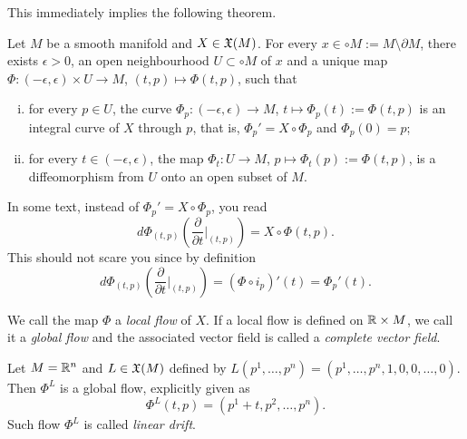 This immediately implies the following theorem.

\begin{theorem} %
  \label{thm:exuniqloc}
  Let $M$ be a smooth manifold and $X\in\mathfrak{X}(M)$. For every $x\in \circ M := M\setminus \partial M$, there exists $\epsilon > 0$, an open neighbourhood $U\subset\circ M$ of $x$ and a unique map $\Phi : (-\epsilon, \epsilon) \times U \to M$, $(t, p) \mapsto \Phi(t,p)$, such that
  \begin{enumerate}[(i)]
    \item for every $p\in U$, the curve $\Phi_p : (-\epsilon, \epsilon) \to M$, $t\mapsto \Phi_p(t) := \Phi(t, p)$ is an integral curve of $X$ through $p$, that is, $\Phi_p' = X\circ\Phi_p$ and $\Phi_p(0) = p$;
    \item for every $t\in(-\epsilon, \epsilon)$, the map $\Phi_t: U \to M$, $p\mapsto \Phi_t(p):=\Phi(t,p)$, is a diffeomorphism from $U$ onto an open subset of $M$.
  \end{enumerate}
\end{theorem}
  
\begin{remark}
  In some text, instead of $\Phi_p' = X\circ\Phi_p$, you read
  \begin{equation}
    d\Phi_{(t,p)}\left(\frac{\partial}{\partial t}\Big|_{(t,p)}\right) = X \circ \Phi(t,p).
  \end{equation}
  This should not scare you since by definition
  \begin{equation}
    d\Phi_{(t,p)}\left(\frac{\partial}{\partial t}\Big|_{(t,p)}\right) = (\Phi \circ i_p)'(t) = \Phi_p'(t).
  \end{equation}
\end{remark}

We call the map $\Phi$ a \emph{local flow} of $X$.
If a local flow is defined on $\mathbb{R}\times M$, we call it a \emph{global flow} and the associated vector field is called a \emph{complete vector field}.

\begin{example}\label{example:lineardrift}
  Let $M=\mathbb{R}^n$ and $L\in\mathfrak{X}(M)$ defined by $L(p^1, \ldots, p^n) = (p^1, \ldots, p^n, 1, 0, 0, \ldots, 0)$.
  Then $\Phi^L$ is a global flow, explicitly given as
  \begin{equation}
    \Phi^L(t,p) = (p^1+t, p^2, \ldots, p^n).
  \end{equation}
  Such flow $\Phi^L$ is called \emph{linear drift}.
\end{example}

